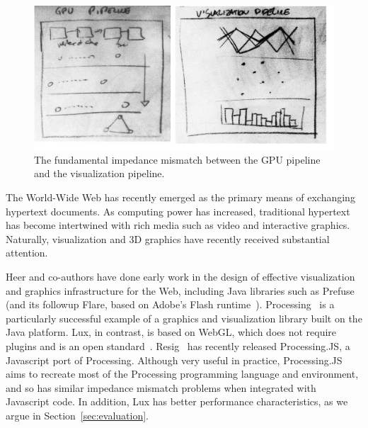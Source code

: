 \begin{figure}
\includegraphics[width=\linewidth]{fig/pipeline_mismatch/pipeline_mismatch.jpg}
\caption{The fundamental impedance mismatch between the GPU pipeline
and the visualization pipeline.\label{fig:mismatch}}
\end{figure}

The World-Wide Web has recently emerged as the primary means of
exchanging hypertext documents. As computing power has increased,
traditional hypertext has become intertwined with rich media such as
video and interactive graphics. Naturally, visualization and 3D
graphics have recently received substantial attention.

Heer and co-authors have done early work in the design of effective
visualization and graphics infrastructure for the Web, including Java
libraries such as Prefuse~\cite{Heer:2005:PAT} (and its followup
Flare, based on Adobe's Flash runtime~\cite{Adobe:2011:Flash}).
Processing~\cite{Reas:2007:PAP} is a particularly successful example
of a graphics and visualization library built on the Java platform.
%
Lux, in contrast, is based on WebGL, which does not require plugins
and is an open standard~\cite{webgl-spec}.
%
Resig~\cite{Resig:2010:PJ} has recently released Processing.JS, a
Javascript port of Processing.
%
Although very useful in practice, Processing.JS aims to recreate most
of the Processing programming language and environment, and so has
similar impedance mismatch problems when integrated with Javascript
code.  In addition, Lux has better performance characteristics, as
we argue in Section~\ref{sec:evaluation}.

